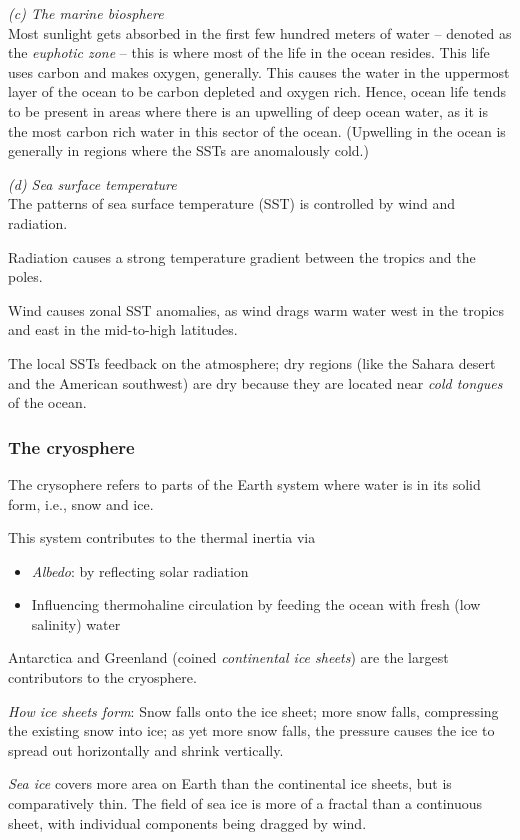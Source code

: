 \documentclass[11pt]{article}
\numberwithin{equation}{section}
\begin{document}
\textit{(c) The marine biosphere}\\
Most sunlight gets absorbed in the first few hundred meters of water -- denoted as the \textit{euphotic zone} -- this is where most of the life in the ocean resides. This life uses carbon and makes oxygen, generally. This causes the water in the uppermost layer of the ocean to be carbon depleted and oxygen rich. Hence, ocean life tends to be present in areas where there is an upwelling of deep ocean water, as it is the most carbon rich water in this sector of the ocean. (Upwelling in the ocean is generally in regions where the SSTs are anomalously cold.)

\textit{(d) Sea surface temperature }\\
The patterns of sea surface temperature (SST) is controlled by wind and radiation. 

Radiation causes a strong temperature gradient between the tropics and the poles. 

Wind causes zonal SST anomalies, as wind drags warm water west in the tropics and east in the mid-to-high latitudes. 

The local SSTs feedback on the atmosphere; dry regions (like the Sahara desert and the American southwest) are dry because they are located near \textit{cold tongues} of the ocean. 

\subsubsection{The cryosphere}
The crysophere refers to parts of the Earth system where water is in its solid form, i.e., snow and ice.

This system contributes to the thermal inertia via
\begin{itemize}
\item \textit{Albedo}: by reflecting solar radiation 
\item Influencing thermohaline circulation by feeding the ocean with fresh (low salinity) water 
\end{itemize}

Antarctica and Greenland (coined \textit{continental ice sheets}) are the largest contributors to the cryosphere.

\textit{How ice sheets form}: Snow falls onto the ice sheet; more snow falls, compressing the existing snow into ice; as yet more snow falls, the pressure causes the ice to spread out horizontally and shrink vertically.

\textit{Sea ice} covers more area on Earth than the continental ice sheets, but is comparatively thin. The field of sea ice is more of a fractal than a continuous sheet, with individual components being dragged by wind. 
\end{document}
